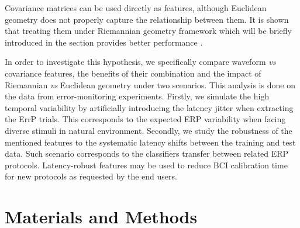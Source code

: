 \documentclass[12pt]{iopart}
\begin{document}
Covariance matrices can be used directly \cite{tomioka_classifying_2007} as features, 
although Euclidean geometry does not properly capture the relationship between them.
It is shown that treating them under Riemannian geometry framework
which will be briefly introduced in the section 
provides better performance \cite{barachant_classification_2013, zanini_transfer_2018}.


In order to investigate this hypothesis,
we specifically compare waveform \textit{vs} covariance features,
the benefits of their combination
and the impact of Riemannian \textit{vs} Euclidean geometry under two scenarios.
This analysis is done on the data from error-monitoring experiments.
Firstly, we simulate the high temporal
variability by artificially introducing the latency jitter when extracting the ErrP trials.
This corresponds to the expected ERP variability when facing diverse stimuli in
natural environment.
Secondly, we study the robustness of the mentioned features
to the systematic latency shifts between the training and test data. 
Such scenario corresponds to the classifiers transfer between
related ERP protocols. Latency-robust features may be used to reduce BCI calibration time
for new protocols as requested by the end users.







\section{Materials and Methods}
\label{sec:methods}
\end{document}
